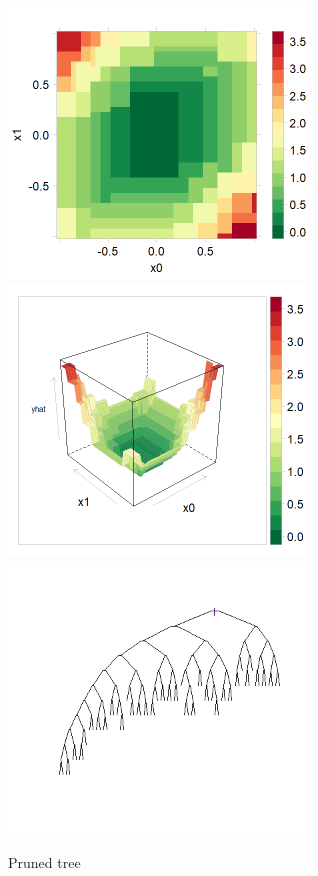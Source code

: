 \documentclass[10pt,openany]{article}
\numberwithin{definition}{section}
\numberwithin{example}{section}
\numberwithin{equation}{section}
\numberwithin{figure}{section}
\begin{document}
\begin{figure}
\noindent \begin{centering}
\includegraphics[width=80mm]{fig/rpart-pruned-levelplot}~
\includegraphics[width=80mm]{fig/rpart-pruned-wireframe}~
\includegraphics[width=80mm]{fig/rpart-pruned-tree}
\par\end{centering}

\protect\caption{\label{fig:pruned-tree}Pruned tree}
\end{figure}
\end{document}
